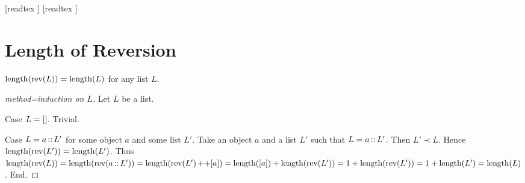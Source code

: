 \documentclass[10pt]{article}
\begin{document}
  \begin{imports}
    \begin{forthel}
      [readtex ]
      [readtex ]
    \end{forthel}
  \end{imports}


  \section*{Length of Reversion}

  \begin{forthel}
    \begin{proposition}[id=LISTS_LENGTHREV_4512036658964875,printid]
      $\textrm{length}(\textrm{rev}(L)) = \textrm{length}(L)$ for any list $L$.
    \end{proposition}
    \begin{proof}[method=induction on $L$]
      Let $L$ be a list.
      
      Case $L = []$. Trivial.
      
      Case $L = a \mathop{::} L'$ for some object $a$ and some list $L'$.
        Take an object $a$ and a list $L'$ such that $L = a \mathop{::} L'$.
        Then $L' \prec L$.
        Hence $\textrm{length}(\textrm{rev}(L')) = \textrm{length}(L')$.
        Thus $\textrm{length}(\textrm{rev}(L))
          = \textrm{length}(\textrm{rev}(a \mathop{::} L'))
          = \textrm{length}(\textrm{rev}(L') \mathop{++} [a])
          = \textrm{length}([a]) + \textrm{length}(\textrm{rev}(L'))
          = 1 + \textrm{length}(\textrm{rev}(L'))
          = 1 + \textrm{length}(L')
          = \textrm{length}(L)$.
      End.
    \end{proof}
  \end{forthel}
\end{document}
